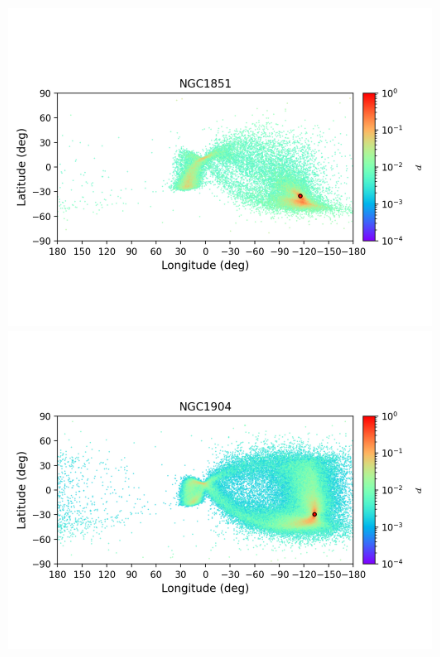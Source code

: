 \begin{figure}
\begin{center}
                \includegraphics[clip=true, trim = 0mm 20mm 0mm 10mm, width=1\columnwidth]{images/error_plots_NGC1851.png}
                \includegraphics[clip=true, trim = 0mm 20mm 0mm 10mm, width=1\columnwidth]{images/error_plots_NGC1904.png}
                

\end{center}
\end{figure}
